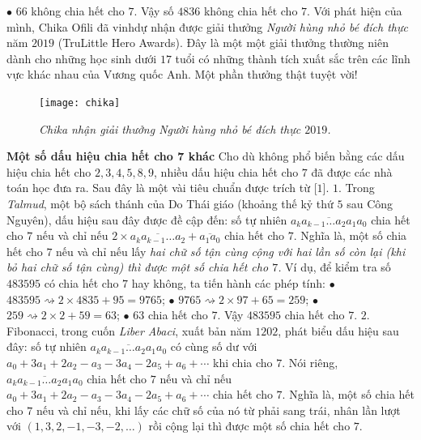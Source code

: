 \begin{multicols}{2}
	\vskip 0.1cm
	$\bullet$ $66$ không chia hết cho $7$. Vậy số $4836$ không chia hết cho $7$.
	\vskip 0.1cm
	Với phát hiện của mình, Chika Ofili đã vinh\linebreak dự nhận được giải thưởng \emph{Người hùng nhỏ bé đích thực} năm $2019$ (TruLittle Hero Awards). Đây là một một giải thưởng thường niên dành cho những học sinh dưới $17$ tuổi có những thành tích xuất sắc trên các lĩnh vực khác nhau của Vương quốc Anh. Một phần thưởng thật tuyệt vời!
	\begin{figure}[H]
		\vspace*{-5pt}
		\centering
		\captionsetup{labelformat= empty, justification=centering}
		\texttt{[image: chika]}
		\caption{\small\textit{\color{quantoan}Chika nhận giải thưởng Người hùng nhỏ bé đích thực $2019$.}}
		\vspace*{-10pt}
	\end{figure}
	\textbf{\color{quantoan}Một số dấu hiệu chia hết cho $\pmb{7}$ khác}
	\vskip 0.1cm
	Cho dù không phổ biến bằng các dấu hiệu chia hết cho $2, 3, 4, 5, 8, 9$, nhiều dấu hiệu chia hết cho $7$ đã được các nhà toán học đưa ra. Sau đây là một vài tiêu chuẩn được trích từ [$1$].
	\vskip 0.1cm
	$1.$ Trong \emph{Talmud}, một bộ sách thánh của Do Thái giáo (khoảng thế kỷ thứ $5$ sau Công Nguyên), dấu hiệu sau đây được đề cập đến:  số tự nhiên $\overline{a_ka_{k-1}\ldots a_2 a_1 a_0}$ chia hết cho $7$ nếu và chỉ nếu $2\times  \overline{a_ka_{k-1}\ldots a_2} + \overline{a_1a_0}$ chia hết cho $7$. Nghĩa là, một số chia hết cho $7$ nếu và chỉ nếu lấy \emph{hai chữ số tận cùng cộng với hai lần số còn lại (khi bỏ hai chữ số tận cùng) thì được một số chia hết cho $7$.}
	\vskip 0.1cm
	Ví dụ, để kiểm tra số $483595$ có chia hết cho $7$ hay không, ta tiến hành các phép tính:
	\vskip 0.1cm
	$\bullet$ $483595 \rightsquigarrow	2\times 4835 + 95= 9765$;
	\vskip 0.1cm
	$\bullet$ $9765 \rightsquigarrow	2\times 97 + 65= 259$;
	\vskip 0.1cm
	$\bullet$ $259 \rightsquigarrow 2\times 2 + 59= 63$;
	\vskip 0.1cm
	$\bullet$ $63$ chia hết cho $7$. Vậy $483595$ chia hết \linebreak cho $7$.
	\vskip 0.1cm
	$2.$ Fibonacci, trong cuốn \emph{Liber Abaci}, xuất bản năm $1202$, phát biểu dấu hiệu sau đây: số tự nhiên $\overline{a_ka_{k-1}\ldots a_2 a_1 a_0}$ có cùng số dư với $a_0+3a_1+ 2a_2 -a_3 -3a_4 -2a_5 + a_6 + \cdots$ khi chia cho $7$. Nói riêng, $\overline{a_ka_{k-1}\ldots a_2 a_1 a_0}$ chia hết cho $7$ nếu và chỉ nếu $a_0+3a_1+ 2a_2 -a_3 -3a_4 -2a_5 + a_6 + \cdots$ chia hết cho $7$. Nghĩa là, một số chia hết cho $7$ nếu và chỉ nếu, khi lấy các chữ số của nó từ phải sang trái, nhân lần lượt với $(1, 3, 2, -1, -3, -2, \ldots)$ rồi cộng lại thì được một số chia hết cho $7$.

\end{multicols}

